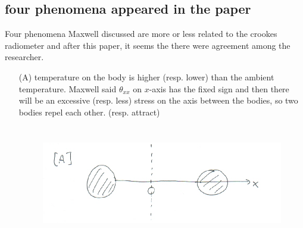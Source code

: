 \documentclass[a4paper,12pt]{article}
\begin{document}
\subsection{four phenomena appeared in the paper}
Four phenomena Maxwell discussed are more or less related to the crookes radiometer and after this paper, it seems the there were agreement among the researcher.

\begin{enumerate}
 \item[(A)] temperature on the body is higher (resp. lower) than the ambient temperature. Maxwell said {{{$\theta_{xx}$}}} on $x$-axis has the fixed sign and then there will be an excessive (resp. less) stress on the axis between the bodies, so two bodies repel each other. (resp. attract)
 \begin{figure}[ht]
  \centering
  \includegraphics[height=5cm]{Maxwell_A.png}
 \end{figure}
 

\end{enumerate}
\end{document}

